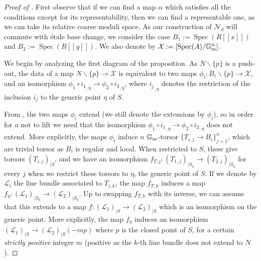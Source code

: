 \documentclass{amsart}
\newcommand{\bG}{\mathbb{G}}
\newcommand{\cL}{\mathcal{L}}
\newcommand{\cN}{\mathcal{N}}
\newcommand{\cX}{\mathcal{X}}
\newcommand{\spec}{\operatorname{Spec}}
\newcommand{\Gm}{\bG_{{\rm m}}}
\theoremstyle{definition}
\begin{document}
\begin{proof}[Proof of ]
First observe that if we can find a map $\alpha$ which satisfies all the conditions except for its representability, then we can find a representable one, as we can take its relative coarse moduli space. 
As our construction of $\cN_d$ will commute with \'etale base change, we consider the case $B_1:=\spec(R[\![x]\!])$ and $B_2 :=\spec(R[\![y]\!])$.
We also denote by $\cX:= [\spec(A)/\Gm^n]$.

We begin by analyzing the first diagram of the proposition. As $N\smallsetminus \{p\}$ is a push-out, the data of a map $N\smallsetminus \{p\}\to \cX$ is equivalent to two maps $\phi_i: B_i\smallsetminus \{p\}\to \cX$, and an isomorphism $\phi_1\circ {i_1}_{,\eta} \to \phi_2\circ {i_2}_{,\eta}$, where ${i_j}_{,\eta}$ denotes the restriction of the inclusion $i_j$ to the generic point $\eta$ of $S$. 

From , the two maps $\phi_i$ extend (we still denote the extensions by $\phi_i$), so in order for $a$ not to lift we need that the isomorphism $\phi_1\circ {i_1}_{,\eta} \to \phi_2\circ {i_2}_{,\eta}$ does not extend. 
More explicitly, the maps $\phi_i$ induce $n$ $\Gm$-torsor $\{T_{i,j}\to B_i\}_{j=1}^n$, which are trivial torsor as $B_i$ is regular and local. When restricted to $S$, these give torsors $(T_{i,j})_{|S}$,
and we have an isomorphism $f_{T,j}:(T_{1,j})_{|S_\eta}\to (T_{2,j})_{|S_\eta}$ for every $j$ when we restrict these torsors to $\eta$, the generic point of $S$. If we denote by $\cL_i$ the line bundle associated to $T_{i,k}$, the map $f_{T,k}$ induces a map $f_\eta:(\cL_1)_{|S_\eta}\to (\cL_2)_{|S_\eta}$. Up to swapping
$f_{T,k}$ with its inverse, we can assume that this extends to a map $f:(\cL_1)_{|S}\to (\cL_2)_{|S}$ which is an isomorphism on the generic point. More explicitly, the map $f_\eta$ induces an isomorphism $(\cL_1)_{|S}\to (\cL_2)_{|S}(-mp)$ where $p$ is the closed point of $S$, for a certain \textit{strictly positive} integer $m$ (positive as the $k$-th line bundle does not extend to $N$).


\end{proof}
\end{document}
